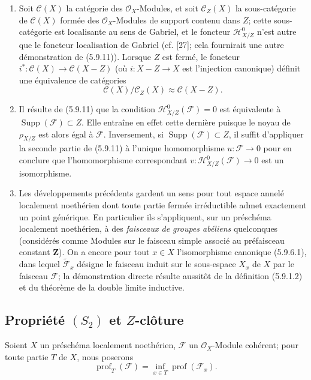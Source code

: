 \begin{remarks}[5.9.12]
\label{IV.2.s5.9.12-fr}
\begin{enumerate}
\item[(i)] Soit $\mathcal C(X)$ la catégorie des $\mathcal O_X$-Modules, et
soit $\mathcal C_Z(X)$ la sous-catégorie de $\mathcal C(X)$ formée des
$\mathcal O_X$-Modules de support contenu dans $Z$; cette sous-catégorie est
localisante au sens de Gabriel, et le foncteur $\mathcal H^0_{X/Z}$ n'est
autre que le foncteur localisation de Gabriel (cf. [27]; cela fournirait une
autre démonstration de (5.9.11)). Lorsque $Z$ est fermé, le foncteur
$i^*:\mathcal C(X)\to\mathcal C(X-Z)$ (où $i:X-Z\to X$ est l'injection
canonique) définit une équivalence de catégories
\[
\mathcal C(X)/\mathcal C_Z(X)\approx\mathcal C(X-Z).
\]
\item[(ii)] Il résulte de (5.9.11) que la condition
$\mathcal H^0_{X/Z}(\mathcal F)=0$ est équivalente à
$\operatorname{Supp}(\mathcal F)\subset Z$. Elle entraîne en effet cette
dernière puisque le noyau de $\rho_{X/Z}$ est alors égal à $\mathcal F$.
Inversement, si $\operatorname{Supp}(\mathcal F)\subset Z$, il suffit
d'appliquer la seconde partie de (5.9.11) à l'unique homomorphisme
$u:\mathcal F\to0$ pour en conclure que l'homomorphisme correspondant
$v:\mathcal H^0_{X/Z}(\mathcal F)\to0$ est un isomorphisme.
\item[(iii)] Les développements précédents gardent un sens pour tout espace
annelé localement noethérien dont toute partie fermée irréductible admet
exactement un point générique. En particulier ils s'appliquent, sur un
préschéma localement noethérien, à des \emph{faisceaux de groupes abéliens}
quelconques (considérés comme Modules sur le faisceau simple associé au
préfaisceau constant $\mathbf Z$). On a encore pour tout $x\in X$
l'isomorphisme canonique (5.9.6.1), dans lequel
$\widetilde{\mathcal F}_x$ désigne le faisceau induit sur le sous-espace
$X_x$ de $X$ par le faisceau $\mathcal F$; la démonstration directe résulte
aussitôt de la définition (5.9.1.2) et du théorème de la double limite
inductive.
\end{enumerate}
\end{remarks}

\subsection{Propriété $(S_2)$ et $Z$-clôture}

\begin{env}[5.10.1]
\label{IV.2.s5.10.1-fr}
Soient $X$ un préschéma localement noethérien, $\mathcal F$ un
$\mathcal O_X$-Module cohérent; pour toute partie $T$ de $X$, nous poserons
\begin{equation}
\operatorname{prof}_T(\mathcal F)
=\inf_{x\in T}\operatorname{prof}(\mathcal F_x).
\tag{5.10.1.1}\label{IV.2.s5.10.1.1-fr}
\end{equation}
\end{env}

